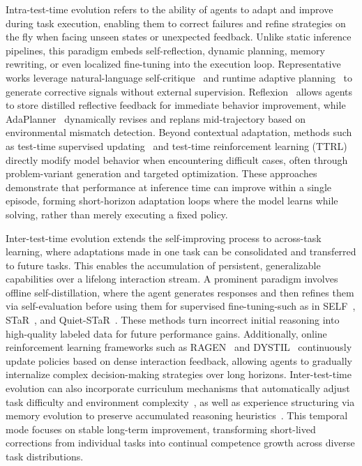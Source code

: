 Intra-test-time evolution refers to the ability of agents to adapt and improve during task execution, enabling them to correct failures and refine strategies on the fly when facing unseen states or unexpected feedback. Unlike static inference pipelines, this paradigm embeds self-reflection, dynamic planning, memory rewriting, or even localized fine-tuning into the execution loop. Representative works leverage natural-language self-critique~\cite{shinn2023reflexion, madaan2023self} and runtime adaptive planning~\cite{sun2023adaplanner, hua2024trustagent} to generate corrective signals without external supervision. Reflexion~\cite{shinn2023reflexion} allows agents to store distilled reflective feedback for immediate behavior improvement, while AdaPlanner~\cite{sun2023adaplanner} dynamically revises and replans mid-trajectory based on environmental mismatch detection. Beyond contextual adaptation, methods such as test-time supervised updating~\cite{zweiger2025self} and test-time reinforcement learning (TTRL)~\cite{zuo2025ttrl, simonds2025ladder} directly modify model behavior when encountering difficult cases, often through problem-variant generation and targeted optimization. These approaches demonstrate that performance at inference time can improve within a single episode, forming short-horizon adaptation loops where the model learns while solving, rather than merely executing a fixed policy.


Inter-test-time evolution extends the self-improving process to across-task learning, where adaptations made in one task can be consolidated and transferred to future tasks. This enables the accumulation of persistent, generalizable capabilities over a lifelong interaction stream. A prominent paradigm involves offline self-distillation, where the agent generates responses and then refines them via self-evaluation before using them for supervised fine-tuning-such as in SELF~\cite{lu2023self}, STaR~\cite{zelikman2022star}, and Quiet-STaR~\cite{ferrag2025reasoning}. These methods turn incorrect initial reasoning into high-quality labeled data for future performance gains. Additionally, online reinforcement learning frameworks such as RAGEN~\cite{wang2025ragen} and DYSTIL~\cite{wang2025dystil}  continuously update policies based on dense interaction feedback, allowing agents to gradually internalize complex decision-making strategies over long horizons. Inter-test-time evolution can also incorporate curriculum mechanisms that automatically adjust task difficulty and environment complexity~\cite{qi2024webrl, lee2024animals}, as well as experience structuring via memory evolution to preserve accumulated reasoning heuristics~\cite{liang2025sage, salama2025meminsight, Wang2024AgentWM}. This temporal mode focuses on stable long-term improvement, transforming short-lived corrections from individual tasks into continual competence growth across diverse task distributions.

